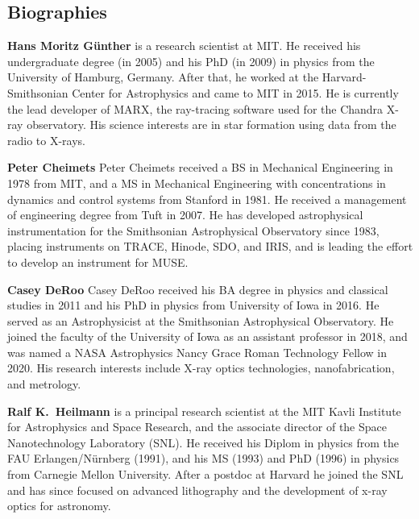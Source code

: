 \documentclass[12pt]{spieman}  %
\begin{document}
\begin{spacing}{2}


\subsection*{Biographies}
\vspace{2ex}\noindent\textbf{Hans Moritz G\"unther} is a research scientist at MIT. He received his undergraduate degree (in 2005) and his PhD (in 2009) in physics from the University of Hamburg, Germany. After that, he worked at the Harvard-Smithsonian Center for Astrophysics and came to MIT in 2015. He is currently the lead developer of MARX, the ray-tracing software used for the Chandra X-ray observatory. His science interests are in star formation using data from the radio to X-rays.

\vspace{1ex}
\vspace{2ex}\noindent\textbf{Peter Cheimets}
Peter Cheimets received a BS in Mechanical Engineering in 1978 from MIT, and a MS in Mechanical Engineering with concentrations in dynamics and control systems from Stanford in 1981. He received a management of engineering degree from Tuft in 2007. He has developed astrophysical instrumentation for the Smithsonian Astrophysical Observatory since 1983, placing instruments on TRACE, Hinode, SDO, and IRIS, and is leading the effort to develop an instrument for MUSE.

\vspace{1ex}
\vspace{2ex}\noindent\textbf{Casey DeRoo}
Casey DeRoo received his BA degree in physics and classical studies in 2011 and his PhD in physics from University of Iowa in 2016. He served as an Astrophysicist at the Smithsonian Astrophysical Observatory. He joined the faculty of the University of Iowa as an assistant professor in 2018, and was named a NASA Astrophysics Nancy Grace Roman Technology Fellow in 2020. His research interests include X-ray optics technologies, nanofabrication, and metrology.


\vspace{1ex}
\vspace{2ex}\noindent\textbf{Ralf K.~Heilmann} is a principal research scientist at the MIT Kavli Institute for Astrophysics and Space Research, and the associate director of the Space Nanotechnology Laboratory (SNL).  He received his Diplom in physics from the FAU Erlangen/N\"urnberg (1991), and his MS (1993) and PhD (1996) in physics from Carnegie Mellon University.  After a postdoc at Harvard he joined the SNL and has since focused on advanced lithography and the development of x-ray optics for astronomy.


\end{spacing}
\end{document}
